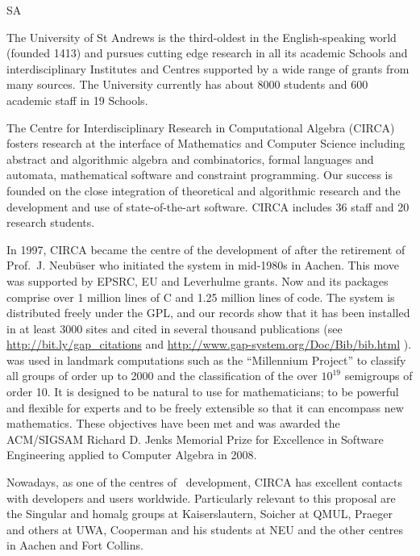 \begin{sitedescription}{SA}

% 


The University of St Andrews is the third-oldest in the
English-speaking world (founded 1413) and pursues cutting edge
research in all its academic Schools and interdisciplinary Institutes
and Centres supported by a wide range of grants from many sources. 
The University currently has about 8000 students and 600
academic staff in 19 Schools.

The Centre for Interdisciplinary Research in Computational Algebra (CIRCA)
fosters research at the interface of Mathematics and Computer Science including
abstract and algorithmic algebra and combinatorics, formal languages and
automata, mathematical software and constraint programming. Our success is 
founded on the close integration of theoretical and algorithmic research and 
the development and use of state-of-the-art software. CIRCA includes
36 staff and 20 research students.

In 1997, CIRCA became the centre of the development of \GAP after the 
retirement of Prof.~J. Neub\"user who initiated the system in 
mid-1980s in Aachen. This move was supported by EPSRC, EU and Leverhulme 
grants. Now \GAP and its packages comprise over 1 million lines of C and 
1.25 million lines of \GAP code. The system is distributed freely under the GPL,
and our records show that it has been installed in at least 3000 sites and 
cited in several thousand publications 
(see \url{http://bit.ly/gap_citations} and \url{http://www.gap-system.org/Doc/Bib/bib.html} ). 
\GAP was used in landmark computations such as the ``Millennium Project'' 
to classify all groups of order up to 2000 
and the classification of the over $10^{19}$ semigroups of order 10. It is 
designed to be natural to use for mathematicians; to be powerful and flexible 
for experts and to be freely extensible so that it can encompass new mathematics. 
These objectives have been met and \GAP was awarded the ACM/SIGSAM Richard D. Jenks
Memorial Prize for Excellence in Software Engineering applied to Computer Algebra in 2008.

Nowadays, as one of the centres of \GAP\ development, CIRCA has
excellent contacts with developers and users worldwide. Particularly 
relevant to this proposal are the Singular and homalg groups at 
Kaiserslautern, Soicher at QMUL, Praeger and others at UWA, Cooperman 
and his students at NEU and the other \GAP centres in Aachen and Fort Collins.


\end{sitedescription}
